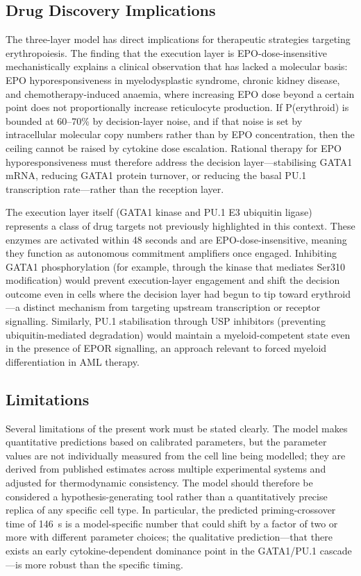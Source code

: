 \subsection{Drug Discovery Implications}

The three-layer model has direct implications for therapeutic strategies targeting erythropoiesis. The finding that the execution layer is EPO-dose-insensitive mechanistically explains a clinical observation that has lacked a molecular basis: EPO hyporesponsiveness in myelodysplastic syndrome, chronic kidney disease, and chemotherapy-induced anaemia, where increasing EPO dose beyond a certain point does not proportionally increase reticulocyte production. If P(erythroid) is bounded at 60--70\% by decision-layer noise, and if that noise is set by intracellular molecular copy numbers rather than by EPO concentration, then the ceiling cannot be raised by cytokine dose escalation. Rational therapy for EPO hyporesponsiveness must therefore address the decision layer---stabilising GATA1 mRNA, reducing GATA1 protein turnover, or reducing the basal PU.1 transcription rate---rather than the reception layer.

The execution layer itself (GATA1 kinase and PU.1 E3 ubiquitin ligase) represents a class of drug targets not previously highlighted in this context. These enzymes are activated within 48 seconds and are EPO-dose-insensitive, meaning they function as autonomous commitment amplifiers once engaged. Inhibiting GATA1 phosphorylation (for example, through the kinase that mediates Ser310 modification) would prevent execution-layer engagement and shift the decision outcome even in cells where the decision layer had begun to tip toward erythroid---a distinct mechanism from targeting upstream transcription or receptor signalling. Similarly, PU.1 stabilisation through USP inhibitors (preventing ubiquitin-mediated degradation) would maintain a myeloid-competent state even in the presence of EPOR signalling, an approach relevant to forced myeloid differentiation in AML therapy.

\subsection{Limitations}

Several limitations of the present work must be stated clearly. The model makes quantitative predictions based on calibrated parameters, but the parameter values are not individually measured from the cell line being modelled; they are derived from published estimates across multiple experimental systems and adjusted for thermodynamic consistency. The model should therefore be considered a hypothesis-generating tool rather than a quantitatively precise replica of any specific cell type. In particular, the predicted priming-crossover time of 146~s is a model-specific number that could shift by a factor of two or more with different parameter choices; the qualitative prediction---that there exists an early cytokine-dependent dominance point in the GATA1/PU.1 cascade---is more robust than the specific timing.

